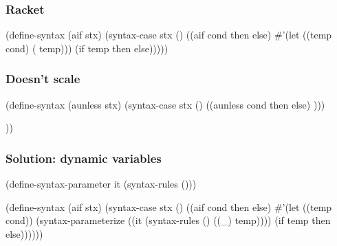 \documentclass[hyperref={bookmarks=false}]{beamer}
\begin{document}
\begin{frame}[fragile]
\frametitle{Racket}
\begin{semiverbatim}

(define-syntax (aif stx)
  (syntax-case stx ()
    ((aif cond then else)
       #'(let ((temp cond)
               ( temp)))
           (if temp then else)))))

\end{semiverbatim}
\end{frame}

\begin{frame}[fragile]
\frametitle{Doesn't scale}
\begin{semiverbatim}

(define-syntax (aunless stx)
  (syntax-case stx ()
    ((aunless cond then else)
     )))

        
    ))
\end{semiverbatim}
\end{frame}

\begin{frame}[fragile]
\frametitle{Solution: dynamic variables}
\begin{semiverbatim}

\alert{(define-syntax-parameter it (syntax-rules ()))}

(define-syntax (aif stx)
  (syntax-case stx ()
    ((aif cond then else)
     #'(let ((temp cond))
         \alert{(syntax-parameterize}
         \alert{((it (syntax-rules () ((_) temp))))}
           (if temp then else))))))
\end{semiverbatim}
\end{frame}
\end{document}
